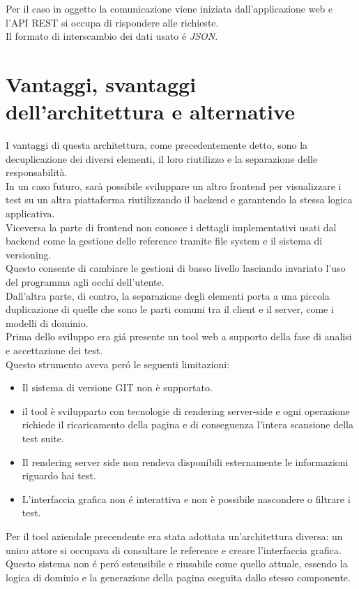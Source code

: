         Per il caso in oggetto la comunicazione viene iniziata dall'applicazione web e l'API REST si occupa di rispondere alle richieste.\\
        Il formato di interscambio dei dati usato \'e \textit{JSON}\cite{JSON}.

    \section{Vantaggi, svantaggi dell'architettura e alternative}
        I vantaggi di questa architettura, come precedentemente detto, sono la decuplicazione dei diversi elementi, il loro riutilizzo e la separazione delle responsabilità.\\
        
        In un caso futuro, sarà possibile sviluppare un altro frontend per visualizzare i test su un altra piattaforma riutilizzando il backend e garantendo la stessa logica applicativa.\\
        Viceversa la parte di frontend non conosce i dettagli implementativi usati dal backend come la gestione delle reference tramite file system e il sistema di versioning.\\
        Questo consente di cambiare le gestioni di basso livello lasciando invariato l'uso del programma agli occhi dell'utente.\\  
        
        Dall'altra parte, di contro, la separazione degli elementi porta a una piccola duplicazione di quelle che sono le parti comuni tra il client e il server, come i modelli di dominio.\\

        Prima dello sviluppo era gi\'a presente un tool web a supporto della fase di analisi e accettazione dei test.\\
        Questo strumento aveva per\'o le seguenti limitazioni:\\
            \begin{itemize}
                \item Il sistema di versione GIT non è supportato.
                \item il tool è svilupparto con tecnologie di rendering server-side e ogni operazione richiede il ricaricamento della pagina e di conseguenza l'intera scansione della test suite.
                \item Il rendering server side non rendeva disponibili esternamente le informazioni riguardo hai test.
                \item L'interfaccia grafica non \'e interattiva e non è possibile nascondere o filtrare i test.
            \end{itemize}

        Per il tool aziendale precendente era stata adottata un'architettura diversa: un unico attore si occupava di consultare le reference e creare l'interfaccia grafica. \\
        Questo sistema non \'e per\'o estensibile e riusabile come quello attuale, essendo la logica di dominio e la generazione della pagina eseguita dallo stesso componente.
